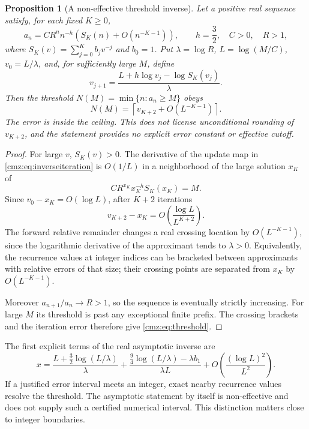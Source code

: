 \documentclass[11pt,letterpaper]{article}
\numberwithin{equation}{section}
\newtheorem{proposition}[theorem]{Proposition}
\theoremstyle{definition}\newtheorem{definition}[theorem]{Definition}
\theoremstyle{remark}\newtheorem{remark}[theorem]{Remark}
\begin{document}
\begin{proposition}[A non-effective threshold inverse]
\label{cmz:prop:inverse}
Let a positive real sequence satisfy, for each fixed $K\geq0$,
\[
a_n=CR^nn^{-h}\left(S_K(n)+O(n^{-K-1})\right),\qquad
h=\frac32,\quad C>0,\quad R>1,
\]
where $S_K(v)=\sum_{j=0}^K b_jv^{-j}$ and $b_0=1$.
Put $\lambda=\log R$, $L=\log(M/C)$, $v_0=L/\lambda$, and, for sufficiently large $M$, define
\begin{equation}
v_{j+1}=\frac{L+h\log v_j-\log S_K(v_j)}{\lambda}.
\label{cmz:eq:inverseiteration}
\end{equation}
Then the threshold $N(M)=\min\{n:a_n\geq M\}$ obeys
\begin{equation}
N(M)=\left\lceil v_{K+2}+O(L^{-K-1})\right\rceil.
\label{cmz:eq:threshold}
\end{equation}
The error is inside the ceiling. This does not license unconditional rounding of $v_{K+2}$, and the statement provides no explicit error constant or effective cutoff.
\end{proposition}
\begin{proof}
For large $v$, $S_K(v)>0$. The derivative of the update map in \eqref{cmz:eq:inverseiteration} is $O(1/L)$ in a neighborhood of the large solution $x_K$ of
\[
CR^{x_K}x_K^{-h}S_K(x_K)=M.
\]
Since $v_0-x_K=O(\log L)$, after $K+2$ iterations
\[
v_{K+2}-x_K=O\!\left(\frac{\log L}{L^{K+2}}\right).
\]
The forward relative remainder changes a real crossing location by $O(L^{-K-1})$, since the logarithmic derivative of the approximant tends to $\lambda>0$. Equivalently, the recurrence values at integer indices can be bracketed between approximants with relative errors of that size; their crossing points are separated from $x_K$ by $O(L^{-K-1})$.

Moreover $a_{n+1}/a_n\to R>1$, so the sequence is eventually strictly increasing. For large $M$ its threshold is past any exceptional finite prefix. The crossing brackets and the iteration error therefore give \eqref{cmz:eq:threshold}.
\end{proof}

The first explicit terms of the real asymptotic inverse are
\begin{equation}
x=\frac{L+\tfrac32\log(L/\lambda)}{\lambda}
 +\frac{\tfrac94\log(L/\lambda)-\lambda b_1}{\lambda L}
 +O\!\left(\frac{(\log L)^2}{L^2}\right).
\label{cmz:eq:inverseexplicit}
\end{equation}
If a justified error interval meets an integer, exact nearby recurrence values resolve the threshold. The asymptotic statement by itself is non-effective and does not supply such a certified numerical interval. This distinction matters close to integer boundaries.
\end{document}
